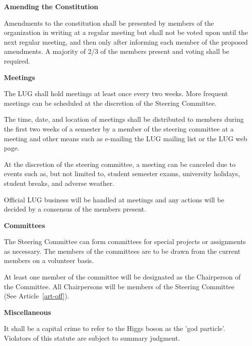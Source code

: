 \bigskip
\begin{art} {\bf Amending the Constitution}
\label{art-amemd}

\begin{sect}
Amendments to the constitution shall be presented by members of the
organization in writing at a regular meeting but shall not be voted
upon until the next regular meeting, and then only after informing
each member of the proposed amendments.  A majority of 2/3 of the
members present and voting shall be required.
\end{sect}

\end{art}

\bigskip
\bigskip
\begin{art} {\bf Meetings}
\label{art-meet}

\begin{sect}
The LUG shall hold meetings at least once every two weeks.
More frequent meetings can be scheduled at the discretion of the 
Steering Committee.
\end{sect}
\begin{sect}
The time, date, and location of meetings shall be distributed to
members during the first two weeks of a semester by a member of the
steering committee at a meeting and other means such as e-mailing the LUG
mailing list or the LUG web page.
\end{sect}
\begin{sect}
At the discretion of the steering committee, a meeting can be canceled
due to events such as, but not limited to, student semester exams, university
holidays, student breaks, and adverse weather.
\end{sect}
\begin{sect}
Official LUG business will be handled at meetings and any actions will be
decided by a consensus of the members present.
\end{sect}

\end{art}

\bigskip
\begin{art} {\bf Committees}
\label{art-coms}

\begin{sect}
The Steering Committee can form committees for special projects or
assignments as necessary. The members of the committees are to be drawn
from the current members on a volunteer basis.
\end{sect}

\begin{sect}
At least one member of the committee will be designated as the Chairperson of
the Committee.  All Chairpersons will be members of the Steering Committee
(See Article~\ref{art-off}).
\end{sect}

\end{art}

\bigskip
\begin{art} {\bf Miscellaneous}
\label{art-misc}

\begin{sect}
It shall be a capital crime to refer to the Higgs boson as the 'god particle'.
Violators of this statute are subject to summary judgment.
\end{sect}

\end{art}

\vfil


